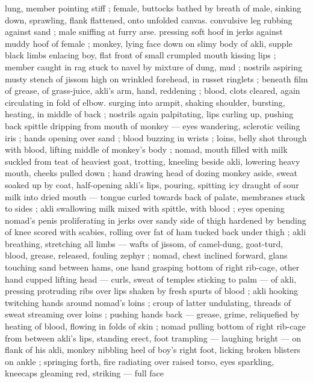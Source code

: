 lung, member pointing stiff ; female, buttocks bathed by breath of 
male, sinking down, sprawling, flank flattened, onto unfolded canvas. 
convulsive leg rubbing against sand ; male sniffing at furry arse. 
pressing soft hoof in jerks against muddy hoof of female ; monkey, 
lying face down on slimy body of akli, supple black limbs enlacing 
boy, flat front of small crumpled mouth kissing lips ; member caught 
in rag stuck to navel by mixture of dung, mud ; nostrils aspiring 
musty stench of jissom high on wrinkled forehead, in russet ringlets 
; beneath film of grease, of grass-juice, akli's arm, hand, reddening 
; blood, clots cleared, again circulating in fold of elbow. surging into 
armpit, shaking shoulder, bursting, heating, in middle of back ; 
nostrils again palpitating, lips curling up, pushing back spittle 
dripping from mouth of monkey --- eyes wandering, sclerotic veiling 
iris ; hands opening over sand ; blood buzzing in wrists ; loins, belly 
shot through with blood, lifting middle of monkey's body ; nomad, 
mouth filled with milk suckled from teat of heaviest goat, trotting, 
kneeling beside akli, lowering heavy mouth, cheeks pulled down ; 
hand drawing head of dozing monkey aside, sweat soaked up by 
coat, half-opening akli's lips, pouring, spitting icy draught of sour 
milk into dried mouth --- tongue curled towards back of palate, 
membranes stuck to sides ; akli swallowing milk mixed with spittle, 
with blood ; eyes opening {\col} nomad's penis proliferating in jerks over 
sandy side of thigh hardened by bending of knee scored with 
scabies, rolling over fat of ham tucked back under thigh ; akli 
breathing, stretching all limbs --- wafts of jissom, of camel-dung, 
goat-turd, blood, grease, released, fouling zephyr ; nomad, chest 
inclined forward, glans touching sand between hams, one hand 
grasping bottom of right rib-cage, other hand cupped lifting head --- 
curls, sweat of temples sticking to palm --- of akli, pressing 
protruding ribs over lips shaken by fresh spurts of blood ; akli 
hooking twitching hands around nomad's loins ; croup of latter 
undulating, threads of sweat streaming over loins ; pushing hands 
back --- grease, grime, reliquefied by heating of blood, flowing in 
folds of skin ; nomad pulling bottom of right rib-cage from between 
akli's lips, standing erect, foot trampling --- laughing bright --- on 
flank of his akli, monkey nibbling heel of boy's right foot, licking 
broken blisters on ankle ; springing forth, fire radiating over raised 
torso, eyes sparkling, kneecaps gleaming red, striking --- full face 
